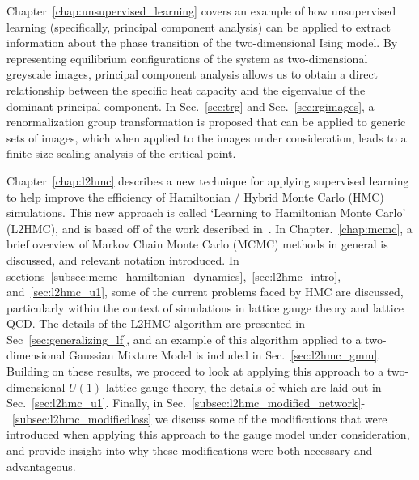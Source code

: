 \documentclass[../main.tex]{subfiles}
\begin{document}
Chapter~\ref{chap:unsupervised_learning} covers an example of how unsupervised
learning (specifically, principal component analysis) can be applied to extract
information about the phase transition of the two-dimensional Ising
model.
%
By representing equilibrium configurations of the system as two-dimensional
greyscale images, principal component analysis allows us to obtain a direct
relationship between the specific heat capacity and the eigenvalue of the
dominant principal component.
%
In Sec.~\ref{sec:trg} and Sec.~\ref{sec:rgimages}, a renormalization group
transformation is proposed that can be applied to generic sets of images, which
when applied to the images under consideration, leads to a finite-size scaling
analysis of the critical point.

Chapter~\ref{chap:l2hmc} describes a new technique for applying supervised
learning to help improve the efficiency of Hamiltonian / Hybrid Monte Carlo
(HMC) simulations.
%
This new approach is called `Learning to Hamiltonian Monte Carlo' (L2HMC), and
is based off of the work described in~\cite{2017arXiv171109268L}.
%
In Chapter.~\ref{chap:mcmc}, a brief overview of Markov Chain Monte Carlo
(MCMC) methods in general is discussed, and relevant notation introduced.
%
In sections~\ref{subsec:mcmc_hamiltonian_dynamics},~\ref{sec:l2hmc_intro},
and~\ref{sec:l2hmc_u1}, some of the current problems faced by HMC are
discussed, particularly within the context of simulations in lattice gauge
theory and lattice QCD.
%
The details of the L2HMC algorithm are presented in
Sec~\ref{sec:generalizing_lf}, and an example of this algorithm applied to a
two-dimensional Gaussian Mixture Model is included in Sec.~\ref{sec:l2hmc_gmm}.
%
Building on these results, we proceed to look at applying this approach to a
two-dimensional $U(1)$ lattice gauge theory, the details of which are laid-out
in Sec.~\ref{sec:l2hmc_u1}.
%
Finally, in
Sec.~\ref{subsec:l2hmc_modified_network}-~\ref{subsec:l2hmc_modifiedloss} we
discuss some of the modifications that were introduced when applying this
approach to the gauge model under consideration, and provide insight into why
these modifications were both necessary and advantageous.
\end{document}
